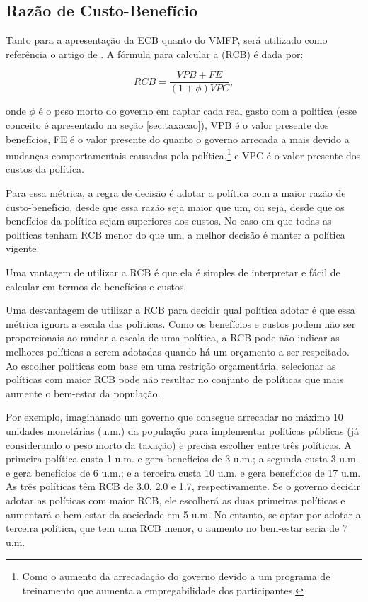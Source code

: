 \documentclass[12pt,letterpaper]{article}
\newcommand{\1}{\mathbbm{1}}
\numberwithin{equation}{section}
\begin{document}
\subsection{Razão de Custo-Benefício}

Tanto para a apresentação da ECB quanto do VMFP, será utilizado como referência o artigo de \textcite{hendren_unified_2020}. A fórmula para calcular a (RCB) é dada por:

\begin{equation}
    RCB = \frac{VPB + FE}{(1 + \phi) VPC},
\end{equation}

\noindent onde $\phi$ é o peso morto do governo em captar cada real gasto com a política (esse conceito é apresentado na seção \ref{sec:taxacao}), VPB é o valor presente dos benefícios, FE é o valor presente do quanto o governo arrecada a mais devido a mudanças comportamentais causadas pela política,\footnote{Como o aumento da arrecadação do governo devido a um programa de treinamento que aumenta a empregabilidade dos participantes.} e VPC é o valor presente dos custos da política.

Para essa métrica, a regra de decisão é adotar a política com a maior razão de custo-benefício, desde que essa razão seja maior que um, ou seja, desde que os benefícios da política sejam superiores aos custos. No caso em que todas as políticas tenham RCB menor do que um, a melhor decisão é manter a política vigente.

Uma vantagem de utilizar a RCB é que ela é simples de interpretar e fácil de calcular em termos de benefícios e custos.

Uma desvantagem de utilizar a RCB para decidir qual política adotar é que essa métrica ignora a escala das políticas. Como os benefícios e custos podem não ser proporcionais ao mudar a escala de uma política, a RCB pode não indicar as melhores políticas a serem adotadas quando há um orçamento a ser respeitado. Ao escolher políticas com base em uma restrição orçamentária, selecionar as políticas com maior RCB pode não resultar no conjunto de políticas que mais aumente o bem-estar da população.

Por exemplo, imaginanado um governo que consegue arrecadar no máximo 10 unidades monetárias (u.m.) da população para implementar políticas públicas (já considerando o peso morto da taxação) e precisa escolher entre três políticas. A primeira política custa 1 u.m. e gera benefícios de 3 u.m.; a segunda custa 3 u.m. e gera benefícios de 6 u.m.; e a terceira custa 10 u.m. e gera benefícios de 17 u.m. As três políticas têm RCB de 3.0, 2.0 e 1.7, respectivamente. Se o governo decidir adotar as políticas com maior RCB, ele escolherá as duas primeiras políticas e aumentará o bem-estar da sociedade em 5 u.m. No entanto, se optar por adotar a terceira política, que tem uma RCB menor, o aumento no bem-estar seria de 7 u.m.
\end{document}
